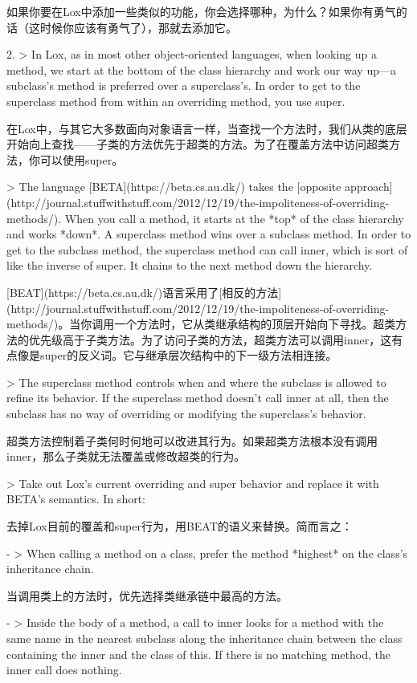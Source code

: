 \documentclass[cn,11pt,chinese]{elegantbook}
\begin{document}
   如果你要在Lox中添加一些类似的功能，你会选择哪种，为什么？如果你有勇气的话（这时候你应该有勇气了），那就去添加它。

2. > In Lox, as in most other object-oriented languages, when looking up a method, we start at the bottom of the class hierarchy and work our way up—a subclass’s method is preferred over a superclass’s. In order to get to the superclass method from within an overriding method, you use super.

   在Lox中，与其它大多数面向对象语言一样，当查找一个方法时，我们从类的底层开始向上查找——子类的方法优先于超类的方法。为了在覆盖方法中访问超类方法，你可以使用super。

   > The language [BETA](https://beta.cs.au.dk/) takes the [opposite approach](http://journal.stuffwithstuff.com/2012/12/19/the-impoliteness-of-overriding-methods/). When you call a method, it starts at the *top* of the class hierarchy and works *down*. A superclass method wins over a subclass method. In order to get to the subclass method, the superclass method can call inner, which is sort of like the inverse of super. It chains to the next method down the hierarchy.

   [BEAT](https://beta.cs.au.dk/)语言采用了[相反的方法](http://journal.stuffwithstuff.com/2012/12/19/the-impoliteness-of-overriding-methods/)。当你调用一个方法时，它从类继承结构的顶层开始向下寻找。超类方法的优先级高于子类方法。为了访问子类的方法，超类方法可以调用inner，这有点像是super的反义词。它与继承层次结构中的下一级方法相连接。

   > The superclass method controls when and where the subclass is allowed to refine its behavior. If the superclass method doesn’t call inner at all, then the subclass has no way of overriding or modifying the superclass’s behavior.

   超类方法控制着子类何时何地可以改进其行为。如果超类方法根本没有调用inner，那么子类就无法覆盖或修改超类的行为。

   > Take out Lox’s current overriding and super behavior and replace it with BETA’s semantics. In short:

   去掉Lox目前的覆盖和super行为，用BEAT的语义来替换。简而言之：

   - > When calling a method on a class, prefer the method *highest* on the class’s inheritance chain.

     当调用类上的方法时，优先选择类继承链中最高的方法。

   - > Inside the body of a method, a call to inner looks for a method with the same name in the nearest subclass along the inheritance chain between the class containing the inner and the class of this. If there is no matching method, the inner call does nothing.
\end{document}
